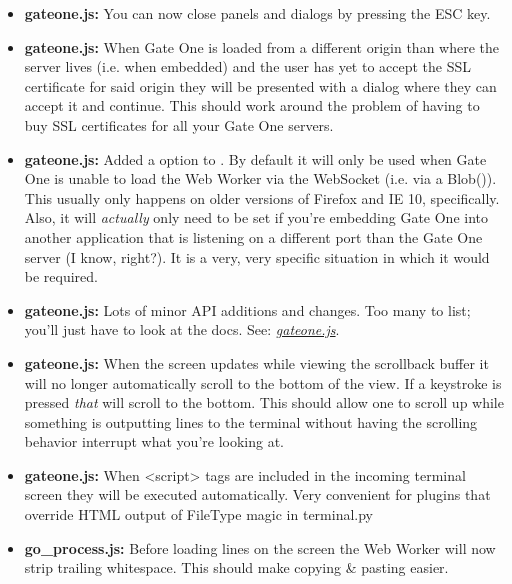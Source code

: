 \documentclass[letterpaper,10pt,openany]{sphinxmanual}
\begin{document}
\begin{itemize}
\item {} 
\textbf{gateone.js:}  You can now close panels and dialogs by pressing the ESC key.

\item {} 
\textbf{gateone.js:}  When Gate One is loaded from a different origin than where the server lives (i.e. when embedded) and the user has yet to accept the SSL certificate for said origin they will be presented with a dialog where they can accept it and continue.  This should work around the problem of having to buy SSL certificates for all your Gate One servers.

\item {} 
\textbf{gateone.js:}  Added a  option to {\hyperref[Developer/js_gateone:GateOne.prefs]{}}.  By default it will only be used when Gate One is unable to load the Web Worker via the WebSocket (i.e. via a Blob()).  This usually only happens on older versions of Firefox and IE 10, specifically.  Also, it will \emph{actually} only need to be set if you're embedding Gate One into another application that is listening on a different port than the Gate One server (I know, right?).  It is a very, very specific situation in which it would be required.

\item {} 
\textbf{gateone.js:}  Lots of minor API additions and changes.  Too many to list; you'll just have to look at the docs.  See: {\hyperref[Developer/js_gateone:gateone-javascript]{\emph{gateone.js}}}.

\item {} 
\textbf{gateone.js:}  When the screen updates while viewing the scrollback buffer it will no longer automatically scroll to the bottom of the view.  If a keystroke is pressed \emph{that} will scroll to the bottom.  This should allow one to scroll up while something is outputting lines to the terminal without having the scrolling behavior interrupt what you're looking at.

\item {} 
\textbf{gateone.js:}  When \textless{}script\textgreater{} tags are included in the incoming terminal screen they will be executed automatically.  Very convenient for plugins that override HTML output of FileType magic in terminal.py

\item {} 
\textbf{go\_process.js:}  Before loading lines on the screen the Web Worker will now strip trailing whitespace.  This should make copying \& pasting easier.


\end{itemize}
\end{document}
